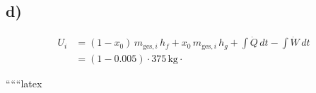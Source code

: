 

\subsection*{d)}
\begin{align*}
U_i &= (1 - x_0) \, m_{\text{ges},i} \, h_f + x_0 \, m_{\text{ges},i} \, h_g + \int \dot{Q} \, dt - \int \dot{W} \, dt \\
&= (1 - 0.005) \cdot 375 \, \text{kg} \cdot
\end{align*}

``````latex